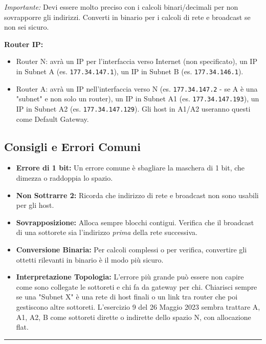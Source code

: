 \textit{Importante:} Devi essere molto preciso con i calcoli binari/decimali per non sovrapporre gli indirizzi. Converti in binario per i calcoli di rete e broadcast se non sei sicuro.

\textbf{Router IP:}
\begin{itemize}
    \item Router N: avrà un IP per l'interfaccia verso Internet (non specificato), un IP in Subnet A (es. \texttt{177.34.147.1}), un IP in Subnet B (es. \texttt{177.34.146.1}).
    \item Router A: avrà un IP nell'interfaccia verso N (es. \texttt{177.34.147.2} - se A è una "subnet" e non solo un router), un IP in Subnet A1 (es. \texttt{177.34.147.193}), un IP in Subnet A2 (es. \texttt{177.34.147.129}). Gli host in A1/A2 useranno questi come Default Gateway.
\end{itemize}

\subsection{Consigli e Errori Comuni}
\begin{itemize}
    \item \textbf{Errore di 1 bit:} Un errore comune è sbagliare la maschera di 1 bit, che dimezza o raddoppia lo spazio.
    \item \textbf{Non Sottrarre 2:} Ricorda che indirizzo di rete e broadcast non sono usabili per gli host.
    \item \textbf{Sovrapposizione:} Alloca sempre blocchi contigui. Verifica che il broadcast di una sottorete sia l'indirizzo \textit{prima} della rete successiva.
    \item \textbf{Conversione Binaria:} Per calcoli complessi o per verifica, convertire gli ottetti rilevanti in binario è il modo più sicuro.
    \item \textbf{Interpretazione Topologia:} L'errore più grande può essere non capire come sono collegate le sottoreti e chi fa da gateway per chi. Chiarisci sempre se una "Subnet X" è una rete di host finali o un link tra router che poi gestiscono altre sottoreti. L'esercizio 9 del 26 Maggio 2023 sembra trattare A, A1, A2, B come sottoreti dirette o indirette dello spazio N, con allocazione flat.
\end{itemize}

\hrule %

